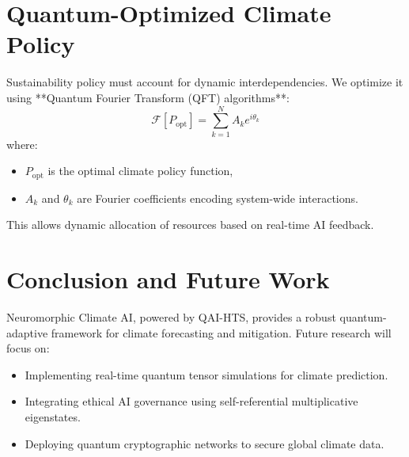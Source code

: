 \documentclass{article}
\theoremstyle{plain}
\begin{document}
\section{Quantum-Optimized Climate Policy}
Sustainability policy must account for dynamic interdependencies. We optimize it using **Quantum Fourier Transform (QFT) algorithms**:
\begin{equation}
    \mathcal{F}[P_{\text{opt}}] = \sum_{k=1}^{N} A_k e^{i\theta_k}
\end{equation}
where:
\begin{itemize}
    \item \( P_{\text{opt}} \) is the optimal climate policy function,
    \item \( A_k \) and \( \theta_k \) are Fourier coefficients encoding system-wide interactions.
\end{itemize}
This allows dynamic allocation of resources based on real-time AI feedback.

\section{Conclusion and Future Work}
Neuromorphic Climate AI, powered by QAI-HTS, provides a robust quantum-adaptive framework for climate forecasting and mitigation. Future research will focus on:
\begin{itemize}
    \item Implementing real-time quantum tensor simulations for climate prediction.
    \item Integrating ethical AI governance using self-referential multiplicative eigenstates.
    \item Deploying quantum cryptographic networks to secure global climate data.
\end{itemize}

\nocite{*}


\end{document}
